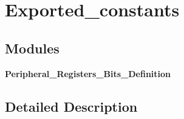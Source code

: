 \section{Exported\+\_\+constants}
\label{group__Exported__constants}
\subsection*{Modules}
\begin{DoxyCompactItemize}
\item 
\textbf{ Peripheral\+\_\+\+Registers\+\_\+\+Bits\+\_\+\+Definition}
\end{DoxyCompactItemize}


\subsection{Detailed Description}
